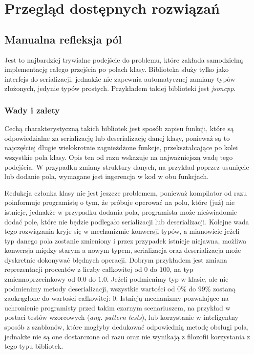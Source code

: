 \documentclass[12pt]{article}
\newcommand{\n}{\newline}
\newcommand{\nonpl}[1]{{\it #1}}
\newcommand{\ang}[1]{\nonpl{ang. #1}}
\begin{document}
	{
		\section{Przegląd dostępnych rozwiązań}

		{
			\subsection{Manualna refleksja pól}

			Jest to najbardziej trywialne podejście do problemu, które zakłada samodzielną implementację całego przejścia
			po polach klasy. Biblioteka służy tylko jako interfejs do serializacji, jednakże nie zapewnia automatycznej
			zamiany typów złożonych, jedynie typów prostych. Przykładem takiej biblioteki jest \nonpl{jsoncpp}\cite{jsoncpp_repo}.\n

			{
				\subsubsection{Wady i zalety}

				Cechą charakterystyczną takich bibliotek jest sposób zapisu funkcji, które są odpowiedzialne za serializację lub deserializację
				danej klasy, ponieważ są to najczęściej długie wielokrotnie zagnieżdżone funkcje, przekształcające po kolei wszystkie pola klasy.
				Opis ten od razu wskazuje na najważniejszą wadę tego podejścia. W przypadku zmiany struktury danych, na przykład poprzez usunięcie
				lub dodanie pola, wymagane jest ingerencja w kod w obu funkcjach.\n

				Redukcja członka klasy nie jest jeszcze problemem, ponieważ kompilator od razu poinformuje programistę o tym, że próbuje operować na polu,
				które (już) nie istnieje, jednakże w przypadku dodania pola, programista może nieświadomie dodać pole, które nie będzie podlegało serializacji
				lub deserializacji. Kolejne wada tego rozwiązania kryje się w mechanizmie konwersji typów, a mianowicie jeżeli typ danego pola zostanie
				zmieniony i przez przypadek istnieje niejawna, możliwa konwersja między starym a nowym typem, serializacja oraz deserializacja może
				dyskretnie dokonywać błędnych operacji. Dobrym przykładem jest zmiana reprezentacji procentów z liczby całkowitej od $0$ do $100$,
				na typ zmiennoprzecinkowy od $0.0$ do $1.0$. Jeżeli podmienimy typ w klasie, ale nie podmienimy metody deserializacji, wszystkie wartości
				od $0\%$ do $99\%$ zostaną zaokrąglone do wartości całkowitej: $0$. Istnieją mechanizmy pozwalające na uchronienie programisty przed takim
				czarnym scenariuszem, na przykład w postaci testów wzorcowych (\ang{pattern tests}), lub korzystanie w inteligentny sposób z szablonów,
				które mogłyby dedukować odpowiednią metodę obsługi pola, jednakże nie są one dostarczone od razu oraz nie wynikają z filozofii
				korzystania z tego typu bibliotek.\n

}}}
\end{document}
